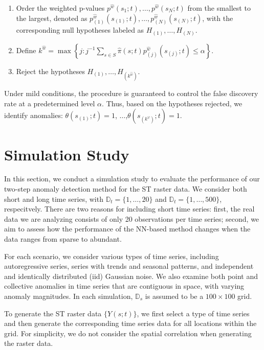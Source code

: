 \documentclass[11pt]{article}
\begin{document}
\begin{enumerate}
    \item Order the weighted p-values $p^{\hat{w}}(s_1;t), \ldots, p^{\hat{w}}(s_N;t)$ from the smallest to the largest, denoted as $p_{(1)}^{\hat{w}}(s_{(1)};t), \ldots, p_{(N)}^{\hat{w}}(s_{(N)};t)$, with the corresponding null hypotheses labeled as $H_{(1)}, \ldots, H_{(N)}$. 
    \item Define $k^{\hat{w}} = \max\left\{j : j^{-1}\sum_{s \in S} \hat{\pi}(s;t)p_{(j)}^{\hat{w}}(s_{(j)};t) \leq \alpha\right\}$.
    \item Reject the hypotheses $H_{(1)}, \ldots, H_{(k^{\hat{w}})}$.  
\end{enumerate}	

Under mild conditions, the procedure is guaranteed to control the false discovery rate at a predetermined level $\alpha$. Thus, based on the hypotheses rejected, we identify anomalies: $\theta(s_{(1)};t)=1$, $\ldots$,$\theta(s_{(k^{\psi})};t)=1$.





\section{Simulation Study}\label{sec: simulation}
In this section, we conduct a simulation study to evaluate the performance of our two-step anomaly detection method for the ST raster data. We consider both short and long time series, with $\mathbb{D}_t=\{1,\ldots,20\}$ and $\mathbb{D}_t=\{1,\ldots,500\}$, respecitvely. There are two reasons for including short time series: first, the  real data we are analyzing consists of only 20 observations per time series; second, we aim to assess how the performance of the NN-based method changes when the data ranges from sparse to abundant.

For each scenario, we consider various types of time series, including autoregressive series, series with trends and seasonal patterns, and independent and identically distributed (iid) Gaussian noise. We also examine both point and collective anomalies in time series that are contiguous in space, with varying anomaly magnitudes. In each simulation, $\mathbb{D}_s$ is assumed to be a $100\times 100$ grid. 

To generate the ST raster data $\{Y(s;t)\}$, we first select a type of time series and then generate the corresponding time series data for all locations within the grid. For simplicity, we do not consider the spatial correlation when generating the raster data. 
\end{document}
